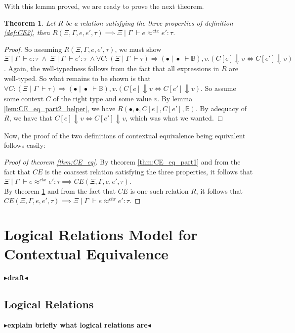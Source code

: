 \documentclass[twoside,11pt,openright]{report}
\newtheorem{theorem}{Theorem}
\theoremstyle{definition}
\newcommand{\expr}{e}
\newcommand{\val}{v}
\newcommand{\ctx}{C}
\newcommand{\Tbool}{\mathbb{B}}
\newcommand{\typ}{\tau}
\newcommand{\venv}{\Gamma}
\newcommand{\tenv}{\Xi}
\newcommand{\emptenv}{\bullet}
\newcommand{\empvenv}{\bullet}
\newcommand{\jdg}[4]{#1 \; | \; #2 \; \vdash #3 : #4}
\newcommand{\jdgType}[3]{#1 \; | \; #2 \; \vdash #3}
\newcommand{\jdgRel}[6]{#1 \; | \; #2 \; \vdash #3 \approx^{#4} #5 : #6}
\newcommand{\ctxRel}[5]{\jdgRel{#1}{#2}{#3}{ctx}{#4}{#5}}
\newcommand{\todo}[1]{{\color[rgb]{.5,0,0}\textbf{$\blacktriangleright$#1$\blacktriangleleft$}}}
\begin{document}
With this lemma proved, we are ready to prove the next theorem.
\begin{theorem}\label{thm:CE_eq_part2}
  Let $R$ be a relation satisfying the three properties of definition \ref{def:CE2}, then $R(\tenv, \venv, \expr, \expr', \typ) \implies \ctxRel{\tenv}{\venv}{\expr}{\expr'}{\typ}$.
\end{theorem}
\begin{proof}
  So assuming $R(\tenv, \venv, \expr, \expr', \typ)$, we must show 
  $\jdg{\tenv}{\venv}{\expr}{\typ} \; \land \; \jdg{\tenv}{\venv}{\expr'}{\typ} \; \land \forall \ctx : (\jdgType{\tenv}{\venv}{\typ}) \Rightarrow (\jdgType{\emptenv}{\empvenv}{\Tbool}), \val . (\ctx[\expr] \Downarrow \val \iff \ctx[\expr'] \Downarrow \val)$. Again, the well-typedness follows from the fact that all expressions in $R$ are well-typed. So what remains to be shown is that $\forall \ctx : (\jdgType{\tenv}{\venv}{\typ}) \Rightarrow (\jdgType{\emptenv}{\empvenv}{\Tbool}), \val . (\ctx[\expr] \Downarrow \val \iff \ctx[\expr'] \Downarrow \val)$. So assume some context $C$ of the right type and some value $\val$. By lemma \ref{lem:CE_eq_part2_helper}, we have $R(\emptenv, \empvenv, C[\expr], C[\expr'], \Tbool)$. By adequacy of $R$, we have that $\ctx[\expr] \Downarrow \val \iff \ctx[\expr'] \Downarrow \val$, which was what we wanted.
\end{proof}

Now, the proof of the two definitions of contextual equivalence being equivalent follows easily:
\begin{proof}[Proof of theorem \ref{thm:CE_eq}]
  By theorem \ref{thm:CE_eq_part1} and from the fact that $CE$ is the coarsest relation satisfying the three properties, it follows that $\ctxRel{\tenv}{\venv}{\expr}{\expr'}{\typ} \implies CE(\tenv, \venv, \expr, \expr', \typ)$.\\
  By theorem \ref{thm:CE_eq_part2} and from the fact that $CE$ is one such relation $R$, it follows that $CE(\tenv, \venv, \expr, \expr', \typ) \implies \ctxRel{\tenv}{\venv}{\expr}{\expr'}{\typ}$.
\end{proof}


\chapter{Logical Relations Model for Contextual Equivalence}
\label{ch:LR}

\todo{draft}
\section{Logical Relations}
\todo{explain briefly what logical relations are}
\end{document}
